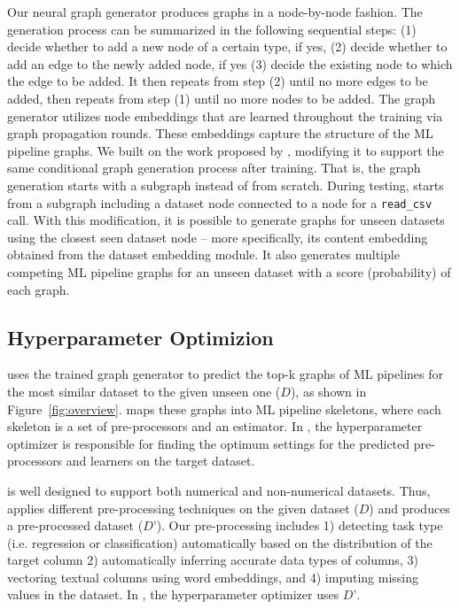 Our neural graph generator produces graphs in a node-by-node fashion. The generation process can be summarized in the following sequential steps: (1) decide whether to add a new node of a certain type, if yes, (2) decide whether to add an edge to the newly added node, if yes (3) decide the existing node to which the edge to be added. It then repeats from step (2) until no more edges to be added, then repeats from step (1) until no more nodes to be added. The graph generator utilizes node embeddings that are learned throughout the training via graph propagation rounds. These embeddings capture the structure of the ML pipeline graphs. We built on the work proposed by \citet{deepgmg}, modifying it to support the same conditional graph generation process after training. That is, the graph generation starts with a subgraph instead of from scratch. During testing, {\sysname} starts from a subgraph including a dataset node connected to a node for a \texttt{read\_csv} call. With this modification, it is possible to generate graphs for unseen datasets using the closest seen dataset node -- more specifically, its content embedding obtained from the dataset embedding module. It also generates multiple competing ML pipeline graphs for an unseen dataset with a score (probability) of each graph.


\subsection{Hyperparameter Optimizion}

{\sysname} uses the trained graph generator to predict the top-k graphs of ML pipelines for the most similar dataset to the given unseen one ($D$), as shown in Figure~\ref{fig:overview}. {\sysname} maps these graphs into ML pipeline skeletons, where each skeleton is a set of pre-processors and an estimator.
In {\sysname}, the hyperparameter optimizer is responsible for finding the optimum settings for the predicted pre-processors and learners on the target dataset.

{\sysname} is well designed to support both  numerical and non-numerical datasets.  Thus, {\sysname}  applies different pre-processing techniques on the given dataset ($D$) and produces a pre-processed dataset ($D’$). Our pre-processing includes 1) detecting task type (i.e. regression or classification) automatically based on the distribution of the target column 2) automatically inferring accurate data types of columns, 3) vectoring textual columns using word embeddings, and 4) imputing missing values in the dataset. In {\sysname}, the hyperparameter optimizer uses $D’$.

